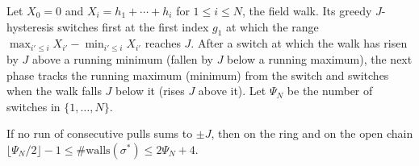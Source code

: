 Let $X_0=0$ and $X_i=h_1+\cdots+h_i$ for $1\le i\le N$, the field walk. Its greedy $J$-hysteresis switches first at the first index $g_1$ at which the range $\max_{i'\le i}X_{i'}-\min_{i'\le i}X_{i'}$ reaches $J$. After a switch at which the walk has risen by $J$ above a running minimum (fallen by $J$ below a running maximum), the next phase tracks the running maximum (minimum) from the switch and switches when the walk falls $J$ below it (rises $J$ above it). Let $\Psi_N$ be the number of switches in $\{1,\dots,N\}$.

\begin{lemma}\label{lem:coh-counting}
If no run of consecutive pulls sums to $\pm J$, then on the ring and on the open chain $\lfloor\Psi_N/2\rfloor-1\le\#\mathrm{walls}(\sigma^\ast)\le2\Psi_N+4$.
\end{lemma}

